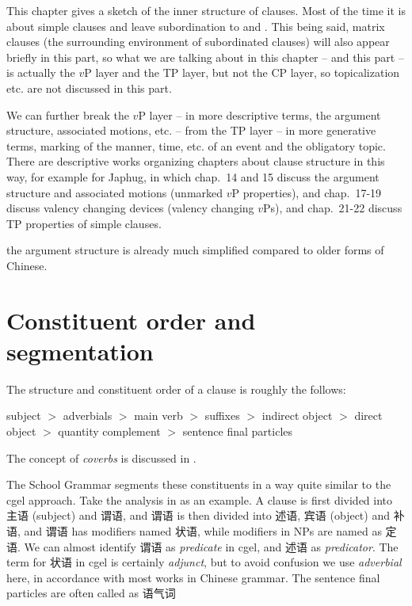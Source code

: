 \documentclass[../main.tex]{subfiles}
\begin{document}
This chapter gives a sketch of the inner structure of clauses.
Most of the time it is about simple clauses and leave subordination to 
 and .
This being said, matrix clauses (the surrounding environment of subordinated clauses)
will also appear briefly in this part, so what we are talking about in this chapter -- and this part -- is 
actually the $v$P layer and the TP layer, but not the CP layer, so topicalization etc. are not 
discussed in this part. 

We can further break the $v$P layer -- in more descriptive terms, the argument 
structure, associated motions, etc.
-- from the TP layer -- in more generative terms, marking of the manner, time, etc. of an event and the
obligatory topic. There are descriptive works organizing chapters about clause structure in this way, for example \citet{jacques2021grammar} for Japhug, in which chap.~14 and 15 discuss the argument structure and associated motions (unmarked $v$P properties), 
and chap.~17-19 discuss valency changing devices (valency changing $v$Ps), and chap.~21-22 discuss TP properties of simple clauses. 

the argument structure is already much simplified compared to older forms of Chinese.

\section{Constituent order and segmentation}

The structure and constituent order of a clause is roughly the follows:
\begin{exe}
    \ex\label{ex:clause-order} subject $>$ adverbials $>$ main verb $>$ suffixes $>$ indirect object $>$ direct object $>$ quantity complement $>$ sentence final particles
\end{exe}
The concept of \emph{coverbs} is discussed in .

The School Grammar segments these constituents in a way quite similar to the \ac{cgel} approach. 
Take the analysis in \citet[chap. 5]{xianhan2004} as an example.
A clause is first divided into 主语 (subject) and 谓语, and 谓语 is then divided into 述语, 宾语 (object) and 补语,
and 谓语 has modifiers named 状语, while modifiers in NPs are named as 定语. We can almost identify 
谓语 as \emph{predicate} in \ac{cgel}, and 述语 as \emph{predicator}. 
The term for 状语 in \ac{cgel} is certainly \emph{adjunct}, but to avoid confusion we use \emph{adverbial}
here, in accordance with most works in Chinese grammar. 
The sentence final particles are often called as 语气词 %
\end{document}
